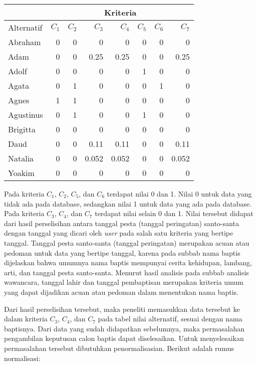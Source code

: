 \documentclass[a4paper,twoside]{article}
\begin{document}
\begin{enumerate}
\begin{center}
\begin{tabular}{|l|r|r|r|r|r|r|r|}  
    \hline
    &
    \multicolumn{7}{|c|}{Kriteria} \\
		\hline
    Alternatif    & $C_{1}$ & $C_{2}$ & $C_{3}$ & $C_{4}$ & $C_{5}$ & $C_{6}$ & $C_{7}$ \\
    \hline
    Abraham     & 0&0&0&0&0&0&0     \\ \hline
    Adam	      & 0&0&0.25&0.25&0&0&0.25    \\ \hline
    Adolf       & 0&0&0&0&1&0&0      \\ \hline
    Agata       & 0&1&0&0&0&1&0  \\ \hline
		Agnes    		& 1&1&0&0&0&0&0     \\ \hline
    Agustinus	  & 0&1&0&0&1&0&0    \\ \hline
    Brigitta    & 0&0&0&0&0&0&0      \\ \hline
    Daud       	& 0&0&0.11&0.11&0&0&0.11  \\ \hline
		Natalia     & 0&0&0.052&0.052&0&0&0.052      \\ \hline
    Yoakim      & 0&0&0&0&0&0&0  \\ \hline
    
  \end{tabular}
	\end{center}
	
 Pada kriteria $C_{1}$, $C_{2}$, $C_{5}$, dan $C_{6}$ terdapat nilai 0 dan 1. Nilai 0 untuk data yang tidak ada pada database, sedangkan nilai 1 untuk data yang ada pada database.	Pada kriteria $C_{3}$, $C_{4}$, dan $C_{7}$ terdapat nilai selain 0 dan 1. Nilai tersebut didapat dari hasil perselisihan antara tanggal pesta (tanggal peringatan) santo-santa dengan tanggal yang dicari oleh \textit{user} pada salah satu kriteria yang bertipe tanggal. Tanggal pesta santo-santa (tanggal peringatan) merupakan acuan atau pedoman untuk data yang bertipe tanggal, karena pada subbab nama baptis dijelaskan bahwa umumnya nama baptis mempunyai cerita kehidupan, lambang, arti, dan tanggal pesta santo-santa. Menurut hasil analisis pada subbab analisis wawancara, tanggal lahir dan tanggal pembaptisan merupakan kriteria umum yang dapat dijadikan acuan atau pedoman dalam menentukan nama baptis.



Dari hasil perselisihan tersebut, maka peneliti memasukkan data tersebut ke dalam kriteria $C_{3}$, $C_{4}$, dan $C_{7}$ pada tabel nilai alternatif, sesuai dengan nama baptisnya. Dari data yang sudah didapatkan sebelumnya, maka permasalahan pengambilan keputusan calon baptis dapat diselesaikan. Untuk menyelesaikan permasalahan tersebut dibutuhkan penormalisasian. Berikut adalah rumus normalisasi:


\end{enumerate}
\end{document}
